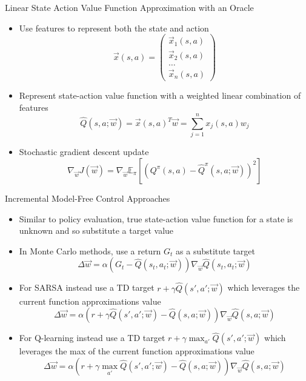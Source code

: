 \documentclass[aspectratio=169]{../latex_main/tntbeamer}  %
\begin{document}
\begin{frame}[c]{Linear State Action Value Function Approximation with an Oracle}

	\begin{itemize}
		\item Use features to represent both the state and action
		$$\vec{x}(s,a) = \begin{pmatrix}
			\vec{x}_1(s,a)\\
			\vec{x}_2(s,a)\\
			\ldots\\
			\vec{x}_n(s,a)
		\end{pmatrix} $$
		\item Represent state-action value function with a weighted linear
		combination of features
		$$\hat{Q}(s,a;\vec{w}) = \vec{x}(s,a)^T \vec{w} = \sum_{j=1}^n x_j(s,a)w_j $$
		\item Stochastic gradient descent update
		$$\nabla_{\vec{w}} J(\vec{w}) = \nabla_{\vec{w}} \mathbb{E}_\pi [(Q^\pi(s,a) - \hat{Q}^\pi(s,a;\vec{w}))^2] $$
	\end{itemize}

\end{frame}
\begin{frame}[c]{Incremental Model-Free Control Approaches}

	\begin{itemize}
		\item Similar to policy evaluation, true state-action value function for a state is unknown and so substitute a target value
		\item In Monte Carlo methods, use a return $G_t$ as a substitute target
		$$\Delta \vec{w} = \alpha(G_t - \hat{Q}(s_t,a_t; \vec{w})) \nabla_{\vec{w}} \hat{Q}(s_t, a_t; \vec{w}) $$
		\item For SARSA instead use a TD target $r+ \gamma \hat{Q}(s', a'; \vec{w})$ which leverages the current function approximations value
		$$\Delta \vec{w} = \alpha (r + \gamma \hat{Q}(s',a';\vec{w}) - \hat{Q}(s,a;\vec{w})) \nabla_{\vec{w}}\hat{Q}(s,a;\vec{w}) $$
		\item For Q-learning instead use a TD target $r + \gamma \max_{a'} \hat{Q}(s',a';\vec{w})$ which leverages the max of the current function approximations value
		$$\Delta \vec{w} = \alpha (r + \gamma \max_{a'} \hat{Q}(s',a';\vec{w}) - \hat{Q}(s,a;\vec{w})) \nabla_{\vec{w}}\hat{Q}(s,a;\vec{w}) $$
	\end{itemize}

\end{frame}
\end{document}
